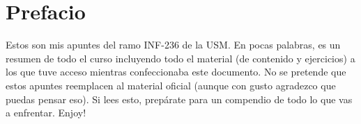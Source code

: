 \chapter*{Prefacio}

Estos son mis apuntes del ramo INF-236 de la USM. En pocas
palabras, es un resumen de todo el curso incluyendo todo
el material (de contenido y ejercicios) a los que tuve acceso
mientras confeccionaba este documento. No se pretende que
estos apuntes reemplacen al material oficial (aunque con
gusto agradezco que puedas pensar eso). Si lees esto,
prepárate para un compendio de todo lo que vas a enfrentar.
Enjoy!
